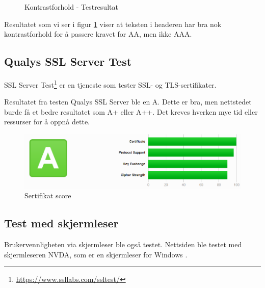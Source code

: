 \begin{figure}[H]
    \begin{center}

        \caption{Kontrastforhold - Testresultat}
        \label{fig:analysis-current-a11y_bg-h1_p}
    \end{center}
\end{figure}

Resultatet som vi ser i figur \ref{fig:analysis-current-a11y_bg-h1_p} viser at teksten i headeren har bra nok kontrastforhold for å passere kravet for AA, men ikke AAA. 

\subsection{Qualys SSL Server Test}
SSL Server Test\footnote{\url{https://www.ssllabs.com/ssltest/}} er en tjeneste som tester SSL- og TLS-sertifikater. 

Resultatet fra testen Qualys SSL Server ble en A. Dette er bra, men nettstedet burde få et bedre resultatet som A+ eller A++. Det kreves hverken mye tid eller ressurser for å oppnå dette.

\begin{figure}[H]
    \centering
    \includegraphics[width=\textwidth]{bjornar/ssllabs.png}
    \caption{Sertifikat score}
    \label{fig:analysis-current-ssl}
\end{figure}

\subsection{Test med skjermleser}
Brukervennligheten via skjermleser ble også testet. Nettsiden ble testet med skjermleseren NVDA, som er en skjermleser for Windows \cite{nvda}. 

